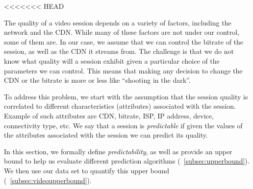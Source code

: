 \label{predictability}

<<<<<<< HEAD

The quality of a video session depends on a variety of factors,
including the network and the CDN. While many of these factors are not
under our control, some of them are. In our case, we assume that we
can control the bitrate of the session, as well as the CDN it streams
from. The challenge is that we do not know what quality will a session
exhibit given a particular choice of the parameters we can
control. This means that making any decision to change the CDN or the
bitrate is more or less like ``shooting in the dark''.

To address this problem, we start with the assumption that the session
quality is correlated to different characteristics (attributes)
associated with the session. Example of such attributes are CDN,
bitrate, ISP, IP address, device, connectivity type, etc. We say that
a session is {\it predictable} if given the values of the attributes
associated with the session we can predict its quality. 

In this section, we formally define {\it predictability}, as well as
provide an upper bound to help us evaluate different prediction
algorithms (\Section~\ref{subsec:upperbound}). We then use our data
set to quantify this upper bound
(\Section~\ref{subsec:videoupperbound}).




